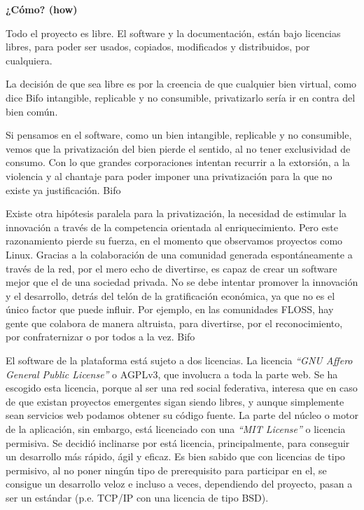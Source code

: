 \documentclass[a4paper, 12pt]{book}
\begin{document}
\textbf{¿Cómo? (how)}

Todo el proyecto es libre. El software y la documentación, están bajo licencias 
libres, para poder ser usados, copiados, modificados y distribuidos, 
por cualquiera.

La decisión de que sea libre es por la creencia de que cualquier bien virtual, 
como dice Bifo intangible, replicable y no consumible, privatizarlo sería ir en 
contra del bien común.

Si pensamos en el software, como un bien intangible, replicable y no consumible, 
vemos que la privatización del bien pierde el sentido, al no tener exclusividad 
de consumo. Con lo que grandes corporaciones intentan recurrir a la extorsión, 
a la violencia y al chantaje para poder imponer una privatización para la que 
no existe ya justificación. Bifo \cite{Bifo Cap. Fraternidad, saber, no saber}

Existe otra hipótesis paralela para la privatización, la necesidad de estimular 
la innovación a través de la competencia orientada al enriquecimiento. 
Pero este razonamiento pierde su fuerza, en el momento que observamos proyectos 
como Linux. Gracias a la colaboración de una comunidad generada espontáneamente 
a través de la red, por el mero echo de divertirse, es capaz de crear un 
software mejor que el de una sociedad privada. No se debe intentar promover la 
innovación y el desarrollo, detrás del telón de la gratificación económica, ya 
que no es el único factor que puede influir. Por ejemplo, en las comunidades 
FLOSS, hay gente que colabora de manera altruista, para divertirse, por el 
reconocimiento, por confraternizar o por todos a la vez.  Bifo 
\cite{Bifo Cap. Fraternidad, saber, no saber}

El software de la plataforma está sujeto a dos licencias. La licencia 
\textit{``GNU Affero General Public License''} o AGPLv3, que involucra a toda 
la parte web. Se ha escogido esta licencia, porque al ser una red social 
federativa, interesa que en caso de que existan proyectos emergentes sigan 
siendo libres, y aunque simplemente sean servicios web podamos obtener su 
código fuente. La parte del núcleo o motor de la aplicación, sin embargo, está 
licenciado con una \textit{``MIT License''} o licencia permisiva. Se decidió 
inclinarse por está licencia, principalmente, para conseguir un desarrollo más 
rápido, ágil y eficaz. Es bien sabido que con licencias de tipo permisivo, al 
no poner ningún tipo de prerequisito para participar en el, se consigue un 
desarrollo veloz e incluso a veces, dependiendo del proyecto, pasan a ser un 
estándar (p.e. TCP/IP con una licencia de tipo BSD).
\end{document}

